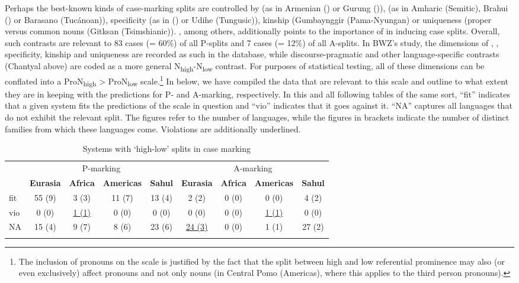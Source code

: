 \documentclass[output=paper]{langscibook}
\begin{document}
 \largerpage
Perhaps the best-known kinds of case-marking splits are controlled by  (as in Armenian () or Gurung ()),  (as in Amharic (Semitic), Brahui () or Barasano (Tucánoan)), specificity (as in  () or Udihe (Tungusic)), kinship (\eg Gumbaynggir (Pama-Nyungan) or uniqueness (proper versus common nouns (\eg Gitksan (Tsimshianic)). 
\citet{Iemmolo2010Topicality}, among others, additionally points to the importance of  in inducing case splits. Overall, such contrasts are relevant to 83 cases (= 60\%) of all P-splits and 7 cases (= 12\%) of all A-splits. In BWZ’s study, the dimensions of , , specificity, kinship and uniqueness are recorded as such in the database, while discourse-pragmatic and other language-specific contrasts (\cf Chantyal above) are coded as a more general N\textsubscript{high}-N\textsubscript{low} contrast. For purposes of statistical testing, all of these dimensions can be conflated into a ProN\textsubscript{high} > ProN\textsubscript{low} scale.\footnote{The inclusion of pronouns on the scale is justified by the fact that the split between high and low referential prominence may also (or even exclusively) affect pronouns and not only nouns (\eg in Central Pomo (Americas), where this applies to the third person pronouns).} In  below, we have compiled the data that are relevant to this scale and outline to what extent they are in keeping with the predictions for P- and A-marking, respectively. In this and all following tables of the same sort, “fit” indicates that a given system fits the predictions of the scale in question and “vio” indicates that it goes against it. “NA” captures all languages that do not exhibit the relevant split. The figures refer to the number of languages, while the figures in brackets indicate the number of distinct families from which these languages come. Violations are additionally underlined.

\begin{table}
\caption{Systems with ‘high-low’ splits in case marking}
\label{18-sc-tab:3}
\begin{tabularx}{\textwidth}{Xcccccccc}
\lsptoprule
& \multicolumn{4}{c}{P-marking} & \multicolumn{4}{c}{A-marking}\\

& \bfseries Eurasia & \bfseries Africa & \bfseries Americas & \bfseries Sahul & \bfseries Eurasia & \bfseries Africa & \bfseries Americas & \bfseries Sahul\\
\midrule
fit & 55 (9) & 3 (3) & 11 (7) & 13 (4) & 2  (2)& 0 (0) & 0 (0) & 4 (2)\\
vio & 0 (0) & \underline{1 (1)} & 0 (0) & 0 (0) & 0 (0) & 0 (0) &\underline{1 (1)} & 0 (0) \\
NA & 15 (4) & 9 (7) & 8 (6) & 23 (6) & \underline{24 (3)} & 0 (0) & 1 (1) & 27 (2)\\
\lspbottomrule
\end{tabularx}
\end{table}
\end{document}

